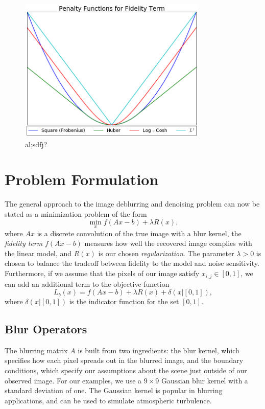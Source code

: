 \documentclass[10pt,a4paper]{article}
\begin{document}
\begin{figure}[H]
\centering
\includegraphics[width=0.8\textwidth]{../figures/penalty_functions.png} 
\caption{al;sdfj?}
\end{figure}

\section{Problem Formulation}
The general approach to the image deblurring and denoising problem can now be stated as a minimization problem of the form \cite{DeblurBook}
\begin{equation} \label{general}
 \min_x f(Ax -b) + \lambda R(x),
\end{equation}
where $Ax$ is a discrete convolution of the true image with a blur kernel, the  \emph{fidelity term} $f(Ax-b)$ measures how well the recovered image complies with the linear model, and $R(x)$ is our chosen \emph{regularization}. The parameter $\lambda > 0$ is chosen to balance the tradeoff between fidelity to the model and noise sensitivity. Furthermore, if we assume that the pixels of our image satisfy $x_{i,j} \in [0,1]$, we can add an additional term to the objective function
\begin{equation} \label{loss}
 L_b(x) = f(Ax-b) + \lambda R(x) + \delta(x | [0,1] ),
\end{equation}
where $\delta(x | [0,1])$ is the indicator function for the set $[0,1]$. 

\subsection{Blur Operators}
The blurring matrix $A$ is built from two ingredients: the blur kernel, which specifies how each pixel spreads out in the blurred image, and the boundary conditions, which specify our assumptions about the scene just outside of our observed image. For our examples, we use a $9 \times 9$ Gaussian blur kernel with a standard deviation of one. The Gaussian kernel is popular in blurring applications, and can be used to simulate atmospheric turbulence. 
\end{document}
